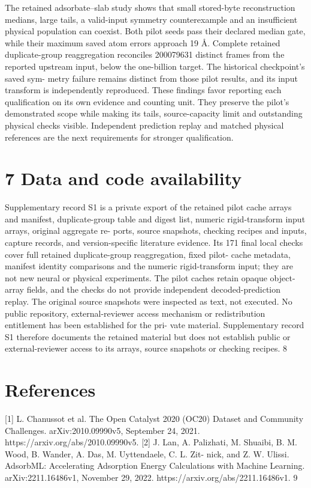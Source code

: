 \documentclass[11pt]{article}
\begin{document}
The retained adsorbate–slab study shows that small stored-byte reconstruction medians, large tails,
a valid-input symmetry counterexample and an insufficient physical population can coexist. Both
pilot seeds pass their declared median gate, while their maximum saved atom errors approach
19 Å. Complete retained duplicate-group reaggregation reconciles 200079631 distinct frames from
the reported upstream input, below the one-billion target. The historical checkpoint’s saved sym-
metry failure remains distinct from those pilot results, and its input transform is independently
reproduced.
These findings favor reporting each qualification on its own evidence and counting unit. They
preserve the pilot’s demonstrated scope while making its tails, source-capacity limit and outstanding
physical checks visible. Independent prediction replay and matched physical references are the next
requirements for stronger qualification.

\section*{7 Data and code availability}

Supplementary record S1 is a private export of the retained pilot cache arrays and manifest,
duplicate-group table and digest list, numeric rigid-transform input arrays, original aggregate re-
ports, source snapshots, checking recipes and inputs, capture records, and version-specific literature
evidence. Its 171 final local checks cover full retained duplicate-group reaggregation, fixed pilot-
cache metadata, manifest identity comparisons and the numeric rigid-transform input; they are not
new neural or physical experiments. The pilot caches retain opaque object-array fields, and the
checks do not provide independent decoded-prediction replay.
The original source snapshots were inspected as text, not executed. No public repository,
external-reviewer access mechanism or redistribution entitlement has been established for the pri-
vate material. Supplementary record S1 therefore documents the retained material but does not
establish public or external-reviewer access to its arrays, source snapshots or checking recipes.
8


\section*{References}

[1] L. Chanussot et al. The Open Catalyst 2020 (OC20) Dataset and Community Challenges.
arXiv:2010.09990v5, September 24, 2021. https://arxiv.org/abs/2010.09990v5.
[2] J. Lan, A. Palizhati, M. Shuaibi, B. M. Wood, B. Wander, A. Das, M. Uyttendaele, C. L. Zit-
nick, and Z. W. Ulissi. AdsorbML: Accelerating Adsorption Energy Calculations with Machine
Learning. arXiv:2211.16486v1, November 29, 2022. https://arxiv.org/abs/2211.16486v1.
9
\end{document}
